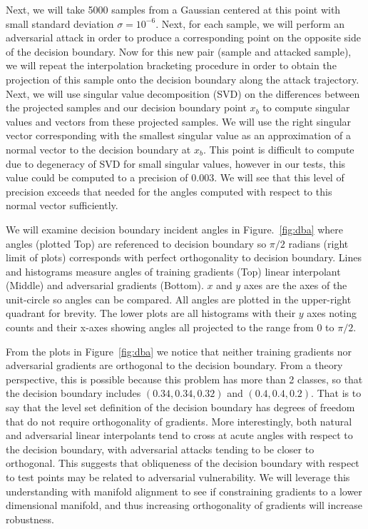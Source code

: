 Next, we will take 5000 samples from a Gaussian centered at this point with small standard deviation $\sigma = 10^{-6}$. Next, for each sample, we will perform an adversarial attack in order to produce a corresponding point on the opposite side of the decision boundary. Now for this new pair (sample and attacked sample), we will repeat the interpolation bracketing procedure in order to obtain the projection of this sample onto the decision boundary along the attack trajectory. Next, we will use singular value decomposition (SVD) on the differences between the projected samples and our decision boundary point $x_b$  to compute singular values and vectors from these projected samples. We will use the right singular vector corresponding with the smallest singular value as an approximation of a normal vector to the decision boundary at $x_b$. This point is difficult to compute due to degeneracy of SVD for small singular values, however in our tests, this value could be computed to a precision of 0.003. We will see that this level of precision exceeds that needed for the angles computed with respect to this normal vector sufficiently. 

We will examine decision boundary incident angles in Figure.~\ref{fig:dba} where angles (plotted Top) are referenced to decision boundary so $\pi/2$ radians (right limit of plots) corresponds with perfect orthogonality to decision boundary. Lines and histograms measure angles of training gradients (Top) linear interpolant (Middle) and adversarial gradients (Bottom). $x$ and $y$ axes are the axes of the unit-circle so angles can be compared. All angles are plotted in the upper-right quadrant for brevity. The lower plots are all histograms with their $y$ axes noting counts and their x-axes showing angles all projected to the range from 0 to $\pi/2$.

From the plots in Figure~\ref{fig:dba} we notice that neither training gradients
nor adversarial gradients are orthogonal to the decision
boundary. From a theory perspective, this is possible because this
problem has more than 2 classes, so that the decision boundary
includes $(0.34, 0.34, 0.32)$ and $(0.4, 0.4, 0.2)$. That is to say
that the level set definition of the decision boundary has degrees of
freedom that do not require orthogonality of gradients. More
interestingly, both natural and adversarial linear interpolants tend
to cross at acute angles with respect to the decision boundary, with
adversarial attacks tending to be closer to orthogonal. This suggests
that obliqueness of the decision boundary with respect to test points
may be related to adversarial vulnerability. We will leverage this understanding with manifold alignment to see if constraining gradients to a lower dimensional manifold, and thus increasing orthogonality of gradients will increase robustness. 

